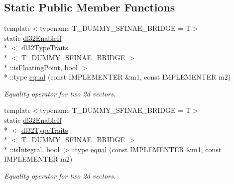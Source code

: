 \subsection*{Static Public Member Functions}
\begin{DoxyCompactItemize}
\item 
{\footnotesize template$<$typename T\-\_\-\-D\-U\-M\-M\-Y\-\_\-\-S\-F\-I\-N\-A\-E\-\_\-\-B\-R\-I\-D\-G\-E  = T$>$ }\\static \hyperlink{structdl32_enable_if}{dl32\-Enable\-If}\\*
$<$ \hyperlink{classdl32_type_traits}{dl32\-Type\-Traits}\\*
$<$ T\-\_\-\-D\-U\-M\-M\-Y\-\_\-\-S\-F\-I\-N\-A\-E\-\_\-\-B\-R\-I\-D\-G\-E $>$\\*
\-::is\-Floating\-Point, bool $>$\\*
\-::type \hyperlink{struct__vector__2d__implementation__homebrew_aefd67fe313aa763544ffc075f67e168d}{equal} (const I\-M\-P\-L\-E\-M\-E\-N\-T\-E\-R \&m1, const I\-M\-P\-L\-E\-M\-E\-N\-T\-E\-R m2)
\begin{DoxyCompactList}\small\item\em Equality operator for two 2d vectors. \end{DoxyCompactList}\item 
{\footnotesize template$<$typename T\-\_\-\-D\-U\-M\-M\-Y\-\_\-\-S\-F\-I\-N\-A\-E\-\_\-\-B\-R\-I\-D\-G\-E  = T$>$ }\\static \hyperlink{structdl32_enable_if}{dl32\-Enable\-If}\\*
$<$ \hyperlink{classdl32_type_traits}{dl32\-Type\-Traits}\\*
$<$ T\-\_\-\-D\-U\-M\-M\-Y\-\_\-\-S\-F\-I\-N\-A\-E\-\_\-\-B\-R\-I\-D\-G\-E $>$\\*
\-::is\-Integral, bool $>$\-::type \hyperlink{struct__vector__2d__implementation__homebrew_a7de8b55d741e160c17e397bf574f89ad}{equal} (const I\-M\-P\-L\-E\-M\-E\-N\-T\-E\-R \&m1, const I\-M\-P\-L\-E\-M\-E\-N\-T\-E\-R m2)
\begin{DoxyCompactList}\small\item\em Equality operator for two 2d vectors. \end{DoxyCompactList}\end{DoxyCompactItemize}
